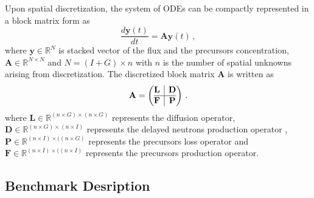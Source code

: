\documentclass[]{interact}
\theoremstyle{plain}%
\theoremstyle{definition}
\theoremstyle{remark}
\begin{document}
Upon spatial discretization, the system of ODEs can be compactly represented in a block matrix form as  
\begin{equation}
	\frac{d\mathbf{y}(t)}{dt} = \mathbf{A}\mathbf{y}(t) \, ,
	\label{eq:transient fom}
\end{equation}
where $\mathbf{y}\in\mathbb{R}^{N}$ is stacked vector of the flux and the precursors concentration, $\mathbf{A}\in\mathbb{R}^{N\times N}$ and $N = (I + G)\times n$ with $n$ is the number of spatial unknowns arising from discretization.
The discretized block matrix $\mathbf{A}$ is written as 
\begin{equation}
	\mathbf{A} =  \left(\begin{array}{@{}c|c@{}}
	\mathbf{L} & \mathbf{D} \\
	\hline
	\mathbf{F} & \mathbf{P}
	\end{array}\right) \, .
\end{equation} 
where $\mathbf{L} \in \mathbb{R}^{(n\times G)\times (n\times G)}$ represents the diffusion operator, $\mathbf{D} \in \mathbb{R}^{(n\times G)\times (n\times I)}$ represents the delayed neutrons production operator , $\mathbf{P} \in \mathbb{R}^{(n\times I)\times ((n\times G)}$ represents the precursors loss operator and $\mathbf{F}\in \mathbb{R}^{(n\times I)\times ((n\times I)}$ represents the precursors production operator.

\subsection{Benchmark Desription}
\end{document}
